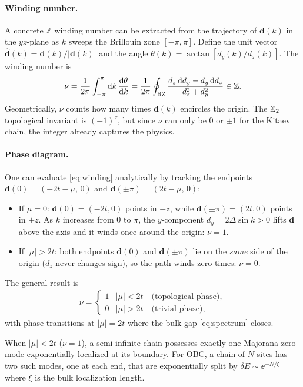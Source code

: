 \paragraph{Winding number.}
A concrete $\mathbb{Z}$ winding number can be extracted from the trajectory of $\mathbf{d}(k)$ in the $yz$-plane as $k$ sweeps the Brillouin zone $[-\pi,\pi]$. Define the unit vector $\hat{\mathbf{d}}(k) = \mathbf{d}(k)/|\mathbf{d}(k)|$ and the angle $\theta(k) = \arctan[d_y(k)/d_z(k)]$. The winding number is
\begin{align}
    \nu = \frac{1}{2\pi}\int_{-\pi}^{\pi}\mathrm{d} k\,\frac{\mathrm{d}\theta}{\mathrm{d} k}
    = \frac{1}{2\pi}\oint_{\rm BZ} \frac{d_z\,\mathrm{d} d_y - d_y\,\mathrm{d} d_z}{d_z^2+d_y^2} \in \mathbb{Z}.
    \label{eq:winding}
\end{align}
Geometrically, $\nu$ counts how many times $\mathbf{d}(k)$ encircles the origin. The $\mathbb{Z}_2$ topological invariant is $(-1)^{\nu}$, but since $\nu$ can only be $0$ or $\pm 1$ for the Kitaev chain, the integer already captures the physics.

\paragraph{Phase diagram.}
One can evaluate \eqref{eq:winding} analytically by tracking the endpoints $\mathbf{d}(0) = (-2t - \mu,\, 0)$ and $\mathbf{d}(\pm\pi) = (2t - \mu,\, 0)$:
\begin{itemize}
    \item If $\mu = 0$: $\mathbf{d}(0) = (-2t, 0)$ points in $-z$, while $\mathbf{d}(\pm\pi) = (2t, 0)$ points in $+z$. As $k$ increases from $0$ to $\pi$, the $y$-component $d_y = 2\Delta\sin k > 0$ lifts $\mathbf{d}$ above the axis and it winds once around the origin: $\nu = 1$.
    \item If $|\mu| > 2t$: both endpoints $\mathbf{d}(0)$ and $\mathbf{d}(\pm\pi)$ lie on the \emph{same} side of the origin ($d_z$ never changes sign), so the path winds zero times: $\nu = 0$.
\end{itemize}
The general result is
\begin{align}
    \nu = \begin{cases} 1 & |\mu| < 2t \quad \text{(topological phase)},\\ 0 & |\mu| > 2t \quad \text{(trivial phase)},\end{cases}
\end{align}
with phase transitions at $|\mu| = 2t$ where the bulk gap \eqref{eq:spectrum} closes.

\begin{theorem}
When $|\mu| < 2t$ ($\nu = 1$), a semi-infinite chain possesses exactly one Majorana zero mode exponentially localized at its boundary. For OBC, a chain of $N$ sites has two such modes, one at each end, that are exponentially split by $\delta E \sim \ee^{-N/\xi}$ where $\xi$ is the bulk localization length.
\end{theorem}

